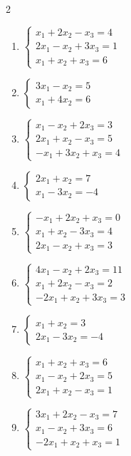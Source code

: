 \begin{multicols}{2}\raggedright
\begin{enumerate}[label=\arabic*., leftmargin=*]

\item $\begin{cases}x_1+2x_2-x_3=4\\2x_1-x_2+3x_3=1\\x_1+x_2+x_3=6\end{cases}$

\item $\begin{cases}3x_1-x_2=5\\x_1+4x_2=6\end{cases}$

\item $\begin{cases}x_1-x_2+2x_3=3\\2x_1+x_2-x_3=5\\-x_1+3x_2+x_3=4\end{cases}$

\item $\begin{cases}2x_1+x_2=7\\x_1-3x_2=-4\end{cases}$

\item $\begin{cases}-x_1+2x_2+x_3=0\\x_1+x_2-3x_3=4\\2x_1-x_2+x_3=3\end{cases}$

\item $\begin{cases}4x_1-x_2+2x_3=11\\x_1+2x_2-x_3=2\\-2x_1+x_2+3x_3=3\end{cases}$

\item $\begin{cases}x_1+x_2=3\\2x_1-3x_2=-4\end{cases}$

\item $\begin{cases}x_1+x_2+x_3=6\\x_1-x_2+2x_3=5\\2x_1+x_2-x_3=1\end{cases}$

\item $\begin{cases}3x_1+2x_2-x_3=7\\x_1-x_2+3x_3=6\\-2x_1+x_2+x_3=1\end{cases}$


\end{enumerate}
\end{multicols}
